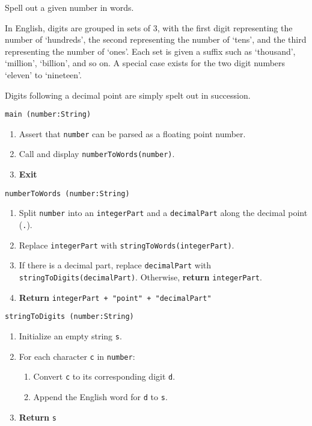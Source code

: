 

\problem Spell out a given number in words.

\solution
In English, digits are grouped in sets of $3$, with the first digit representing the number of `hundreds', 
the second representing the number of `tens', and the third representing the number of `ones'. Each set is given
a suffix such as `thousand', `million', `billion', and so on.
A special case exists for the two digit numbers `eleven' to `nineteen'.

Digits following a decimal point are simply spelt out in succession.

\algorithm
\texttt{main (number:String)}
\begin{enumerate}
	\item Assert that \texttt{number} can be parsed as a floating point number.
	\item Call and display \texttt{numberToWords(number)}.
	\item \textbf{Exit} 
\end{enumerate}
\vspace{5mm}
\texttt{numberToWords (number:String)}
\begin{enumerate}
	\item Split \texttt{number} into an \texttt{integerPart} and a \texttt{decimalPart} along
		the decimal point (\texttt{.}).
	\item Replace \texttt{integerPart} with \texttt{stringToWords(integerPart)}.
	\item If there is a decimal part, replace \texttt{decimalPart} with \texttt{stringToDigits(decimalPart)}.
		Otherwise, \textbf{return} \texttt{integerPart}.
	\item \textbf{Return} \texttt{integerPart + "point" + "decimalPart"}
\end{enumerate}
\vspace{5mm}
\texttt{stringToDigits (number:String)}
\begin{enumerate}
	\item Initialize an empty string \texttt{s}. 
	\item For each character \texttt{c} in \texttt{number}:
	\begin{enumerate}
		\item Convert \texttt{c} to its corresponding digit \texttt{d}.
		\item Append the English word for \texttt{d} to \texttt{s}.
	\end{enumerate}
	\item \textbf{Return} \texttt{s} 
\end{enumerate}
